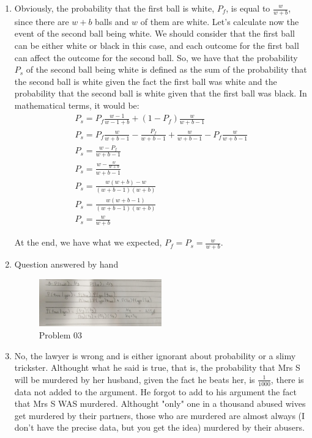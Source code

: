\documentclass{article}
\begin{document}
\begin{enumerate}
	\item Obviously, the probability that the first ball is white, \(P_f\), is equal to \(\frac{w}{w + b}\), since there are \(w + b\) balls and \(w\) of them are white. Let's calculate now the event of the second ball being white. We should consider that the first ball can be either white or black in this case, and each outcome for the first ball can affect the outcome for the second ball. So, we have that the probability \(P_s\) of the second ball being white is defined as the sum of the probability that the second ball is white given the fact the first ball was white and the probability that the second ball is white given that the first ball was black. In mathematical terms, it would be:
	      \begin{gather}
		      P_s = P_f\frac{w - 1}{w - 1 + b} + (1 - P_f)\frac{w}{w + b - 1} \\
		      P_s = P_f\frac{w}{w + b - 1} - \frac{P_f}{w + b - 1} + \frac{w}{w + b - 1} - P_f\frac{w}{w + b - 1} \\
		      P_s = \frac{w - P_f}{w + b - 1} \\
		      P_s = \frac{w - \frac{w}{w + b}}{w + b - 1} \\
		      P_s = \frac{w(w + b) - w}{(w + b - 1)(w + b)} \\
		      P_s = \frac{w(w + b - 1)}{(w + b - 1)(w + b)} \\
		      P_s = \frac{w}{w + b}
	      \end{gather}

	      At the end, we have what we expected, \(P_f = P_s = \frac{w}{w + b}\).

	\item Question answered by hand
	      \begin{figure}[H]
		      \centering
		      \includegraphics[width=0.5\textwidth]{images/03.jpeg}
		      \caption{Problem 03}
	      \end{figure}

	\item No, the lawyer is wrong and is either ignorant about probability or a slimy trickster. Althought what he said is true, that is, the probability that Mrs S will be murdered by her husband, given the fact he beats her, is \(\frac{1}{1000}\), there is data not added to the argument. He forgot to add to his argument the fact that Mrs S WAS murdered. Althought "only" one in a thousand abused wives get murdered by their partners, those who are murdered are almost always (I don't have the precise data, but you get the idea) murdered by their abusers.


\end{enumerate}
\end{document}
